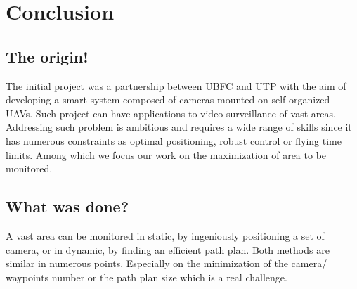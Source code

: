 \chapter{Conclusion}\label{chap:Conclu}

\minitoc



\section{The origin! }
The initial project was a partnership between UBFC and UTP with the aim of developing a smart system composed of cameras mounted on self-organized UAVs. Such project can have applications to video surveillance of vast areas. Addressing such problem is ambitious and requires a wide range of skills since it has numerous constraints as optimal positioning, robust control or flying time limits. Among which we focus our work on the maximization of area to be monitored.


\section{What was done?}
A vast area can be monitored in static, by ingeniously positioning a set of camera, or in dynamic, by finding an efficient path plan. Both methods are similar in numerous points. Especially on the minimization of the camera/ waypoints number  or the path plan size which is a real challenge. 


